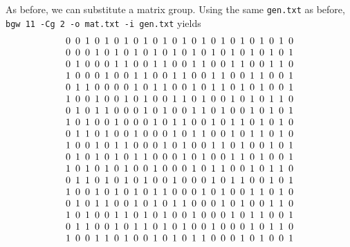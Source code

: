 \documentclass[a4paper,10pt]{article}
\begin{document}
As before, we can substitute a matrix group. Using the same {\tt gen.txt} as before, {\tt bgw 11 -Cg 2 -o mat.txt -i gen.txt} yields
\[
\arraycolsep=2.5pt\def\arraystretch{1.0}
 \begin{array}{rrrrrrrrrrrrrrrrrrrrrrrr}
0 & 0 & 1 & 0 & 1 & 0 & 1 & 0 & 1 & 0 & 1 & 0 & 1 & 0 & 1 & 0 & 1 & 0 & 1 & 0 & 1 & 0 & 1 & 0 \\
0 & 0 & 0 & 1 & 0 & 1 & 0 & 1 & 0 & 1 & 0 & 1 & 0 & 1 & 0 & 1 & 0 & 1 & 0 & 1 & 0 & 1 & 0 & 1 \\
0 & 1 & 0 & 0 & 0 & 1 & 1 & 0 & 0 & 1 & 1 & 0 & 0 & 1 & 1 & 0 & 0 & 1 & 1 & 0 & 0 & 1 & 1 & 0 \\
1 & 0 & 0 & 0 & 1 & 0 & 0 & 1 & 1 & 0 & 0 & 1 & 1 & 0 & 0 & 1 & 1 & 0 & 0 & 1 & 1 & 0 & 0 & 1 \\
0 & 1 & 1 & 0 & 0 & 0 & 0 & 1 & 0 & 1 & 1 & 0 & 0 & 1 & 0 & 1 & 1 & 0 & 1 & 0 & 1 & 0 & 0 & 1 \\
1 & 0 & 0 & 1 & 0 & 0 & 1 & 0 & 1 & 0 & 0 & 1 & 1 & 0 & 1 & 0 & 0 & 1 & 0 & 1 & 0 & 1 & 1 & 0 \\
0 & 1 & 0 & 1 & 1 & 0 & 0 & 0 & 1 & 0 & 1 & 0 & 0 & 1 & 1 & 0 & 1 & 0 & 0 & 1 & 0 & 1 & 0 & 1 \\
1 & 0 & 1 & 0 & 0 & 1 & 0 & 0 & 0 & 1 & 0 & 1 & 1 & 0 & 0 & 1 & 0 & 1 & 1 & 0 & 1 & 0 & 1 & 0 \\
0 & 1 & 1 & 0 & 1 & 0 & 0 & 1 & 0 & 0 & 0 & 1 & 0 & 1 & 1 & 0 & 0 & 1 & 0 & 1 & 1 & 0 & 1 & 0 \\
1 & 0 & 0 & 1 & 0 & 1 & 1 & 0 & 0 & 0 & 1 & 0 & 1 & 0 & 0 & 1 & 1 & 0 & 1 & 0 & 0 & 1 & 0 & 1 \\
0 & 1 & 0 & 1 & 0 & 1 & 0 & 1 & 1 & 0 & 0 & 0 & 1 & 0 & 1 & 0 & 0 & 1 & 1 & 0 & 1 & 0 & 0 & 1 \\
1 & 0 & 1 & 0 & 1 & 0 & 1 & 0 & 0 & 1 & 0 & 0 & 0 & 1 & 0 & 1 & 1 & 0 & 0 & 1 & 0 & 1 & 1 & 0 \\
0 & 1 & 1 & 0 & 1 & 0 & 1 & 0 & 1 & 0 & 0 & 1 & 0 & 0 & 0 & 1 & 0 & 1 & 1 & 0 & 0 & 1 & 0 & 1 \\
1 & 0 & 0 & 1 & 0 & 1 & 0 & 1 & 0 & 1 & 1 & 0 & 0 & 0 & 1 & 0 & 1 & 0 & 0 & 1 & 1 & 0 & 1 & 0 \\
0 & 1 & 0 & 1 & 1 & 0 & 0 & 1 & 0 & 1 & 0 & 1 & 1 & 0 & 0 & 0 & 1 & 0 & 1 & 0 & 0 & 1 & 1 & 0 \\
1 & 0 & 1 & 0 & 0 & 1 & 1 & 0 & 1 & 0 & 1 & 0 & 0 & 1 & 0 & 0 & 0 & 1 & 0 & 1 & 1 & 0 & 0 & 1 \\
0 & 1 & 1 & 0 & 0 & 1 & 0 & 1 & 1 & 0 & 1 & 0 & 1 & 0 & 0 & 1 & 0 & 0 & 0 & 1 & 0 & 1 & 1 & 0 \\
1 & 0 & 0 & 1 & 1 & 0 & 1 & 0 & 0 & 1 & 0 & 1 & 0 & 1 & 1 & 0 & 0 & 0 & 1 & 0 & 1 & 0 & 0 & 1 \\

\end{array}\]
\end{document}
